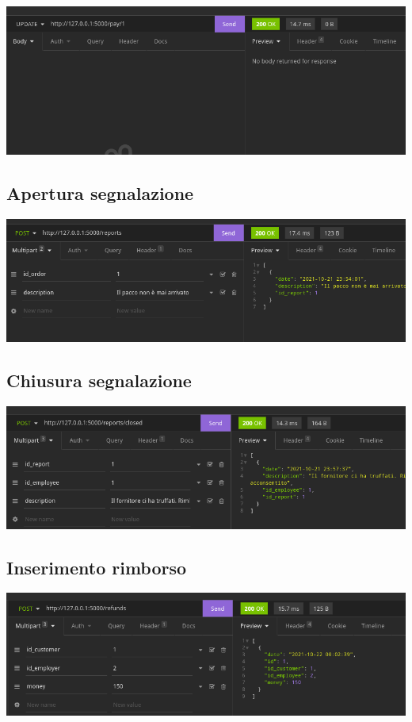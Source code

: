 \includegraphics[scale=0.45]{images/ordine_pagato.png}

\subsection{Apertura segnalazione}

\includegraphics[scale=0.45]{images/inserimento_segnalazione.png}

\subsection{Chiusura segnalazione}

\includegraphics[scale=0.45]{images/chiusura_segnalazione.png}

\subsection{Inserimento rimborso}

\includegraphics[scale=0.45]{images/rimborso.png}

